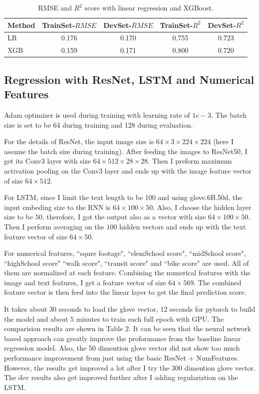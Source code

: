\documentclass{article} %
\begin{document}
\begin{table}[h]
	\begin{center}
		\begin{tabular}{|l|cc|cc|}
			\hline
			 Method &
			TrainSet-$RMSE$ &
			DevSet-$RMSE$ &
			TrainSet-$R^2$ &
			DevSet-$R^2$ \\
			\hline
			LR & 0.176 & 0.170 & 0.755 & 0.723 \\
			\hline
			XGB & 0.159 & 0.171 & 0.800 & 0.720 \\
			\hline
		\end{tabular}
	\end{center}
	\caption{RMSE and $R^2$ score with linear regression and XGBoost.}
\end{table}

\subsection{Regression with ResNet, LSTM and Numerical Features}

Adam optimizer is used during training with learning rate of $1e-3$.
The batch size is set to be 64 during training and 128 during evaluation.

For the details of ResNet,
the input image size is $64 \times 3 \times 224 \times 224$ 
(here I assume the batch size during training).
After feeding the images to ResNet50,
I get its Conv3 layer with size $64 \times 512 \times 28 \times 28$.
Then I preform maximum activation pooling on the Conv3 layer
and ends up with the image feature vector of size $64 \times 512$.

For LSTM, since I limit the text length to be 100 and using glove.6B.50d,
the input embeding size to the RNN is  $64 \times 100 \times 50$.
 Also, I choose the hidden layer size to be $50$,
 therefore, I got the output also as a vector with size $64 \times 100 \times 50$.
 Then I perform averaging on the $100$ hidden vectors and ends up with the text
 feature vector of size $64 \times 50$.
 
 For numerical features,
 ``squre footage", ``elemSchool score", ``midSchool score", ``highSchool score"
 ``walk score", ``transit score" and ``bike score" are used.
 All of them are normalized at each feature.
 Combining the numerical features with the image and text features,
 I get a feature vector of size $64 \times 569$.
 The combined feature vector is then feed into the linear layer to get the final prediction score.

It takes about 30 seconds to load the glove vector, 12 seconds for pytorch to build the model
and about 5 minutes to train each full epoch with GPU.
The comparision results are shown in Table 2.
It can be seen that the neural network based approach 
can greatly improve the proformance from the baseline linear regression model.
Also, the 50 dimention glove vector did not show too much performance improvement
from just using the basic ResNet + NumFeatures.
However, the results get improved a lot after I try the 300 dimention glove vector.
The dev results also get improved further after I adding regulariztion on the LSTM.
\end{document}
